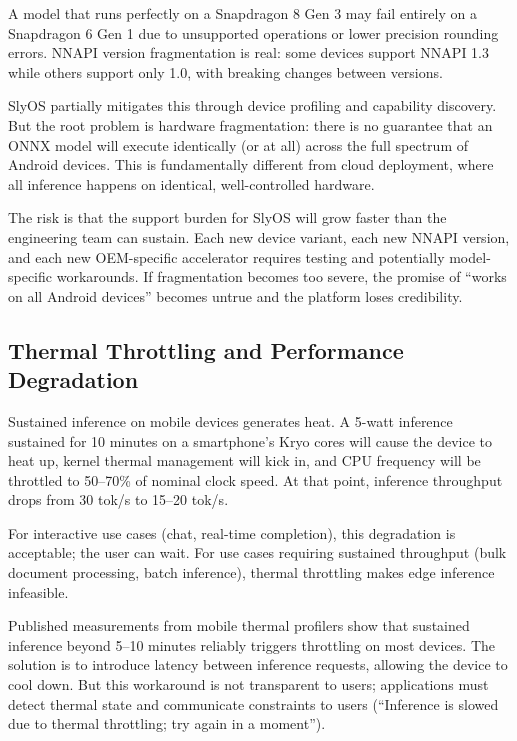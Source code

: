 \documentclass[12pt, letterpaper, twoside]{report}
\begin{document}
A model that runs perfectly on a Snapdragon 8 Gen 3 may fail entirely on a Snapdragon 6 Gen 1 due to unsupported operations or lower precision rounding errors. NNAPI version fragmentation is real: some devices support NNAPI 1.3 while others support only 1.0, with breaking changes between versions.

SlyOS partially mitigates this through device profiling and capability discovery. But the root problem is hardware fragmentation: there is no guarantee that an ONNX model will execute identically (or at all) across the full spectrum of Android devices. This is fundamentally different from cloud deployment, where all inference happens on identical, well-controlled hardware.

The risk is that the support burden for SlyOS will grow faster than the engineering team can sustain. Each new device variant, each new NNAPI version, and each new OEM-specific accelerator requires testing and potentially model-specific workarounds. If fragmentation becomes too severe, the promise of ``works on all Android devices'' becomes untrue and the platform loses credibility.

\subsection{Thermal Throttling and Performance Degradation}
\label{subsec:thermal_risk}

Sustained inference on mobile devices generates heat. A 5-watt inference sustained for 10 minutes on a smartphone's Kryo cores will cause the device to heat up, kernel thermal management will kick in, and CPU frequency will be throttled to 50--70\% of nominal clock speed. At that point, inference throughput drops from 30 tok/s to 15--20 tok/s.

For interactive use cases (chat, real-time completion), this degradation is acceptable; the user can wait. For use cases requiring sustained throughput (bulk document processing, batch inference), thermal throttling makes edge inference infeasible.

Published measurements from mobile thermal profilers show that sustained inference beyond 5--10 minutes reliably triggers throttling on most devices. The solution is to introduce latency between inference requests, allowing the device to cool down. But this workaround is not transparent to users; applications must detect thermal state and communicate constraints to users (``Inference is slowed due to thermal throttling; try again in a moment'').
\end{document}
